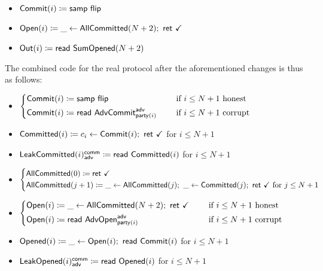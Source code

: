 \begin{itemize}
\item {\color{blue} $\mathsf{Commit}(i) \coloneqq \mathsf{samp} \ \mathsf{flip}$}
\item {\color{teal} $\Open(i) \coloneqq \_ \leftarrow \AllCommitted(N+2); \ \ret{\checkmark}$}
\item $\mathsf{Out}(i) \coloneqq \mathsf{read} \ \mathsf{SumOpened}(N+2)$
\end{itemize}

\noindent The combined code for the real protocol after the aforementioned changes is thus as follows:

\begin{itemize}
\item {\color{blue} $\begin{cases*} \Commit(i) \coloneqq \samp{\flip} & \hspace{10pt} \text{if $i \leq N+1$ honest} \\ \Commit(i) \coloneqq \read{\AdvCommit^\adv_{\party(i)}} & \hspace{10pt} \text{if $i \leq N+1$ corrupt} \end{cases*}$}
\item {\color{magenta} $\mathsf{Committed}(i) \coloneqq c_i \leftarrow \mathsf{Commit}(i); \ \mathsf{ret} \ \checkmark$ for $i \leq N+1$}
\item {\color{magenta} $\mathsf{LeakCommitted}(i)^{\mathsf{comm}}_{\mathsf{adv}} \coloneqq \mathsf{read} \ \mathsf{Committed}(i)$ for $i \leq N+1$}
\item {\color{magenta} $\begin{cases*} \AllCommitted(0) \coloneqq \ret{\checkmark} \\ \AllCommitted(j+1) \coloneqq \_ \leftarrow \AllCommitted(j); \ \_ \leftarrow \Committed(j); \ \ret{\checkmark} \text{ for $j \leq N+1$} \end{cases*}$}
\item {\color{teal} $\begin{cases*} \Open(i) \coloneqq \_ \leftarrow \AllCommitted(N+2); \ \ret{\checkmark} & \hspace{10pt} \text{if $i \leq N+1$ honest} \\ \Open(i) \coloneqq \read{\AdvOpen^\adv_{\party(i)}} & \hspace{10pt} \text{if $i \leq N+1$ corrupt} \end{cases*}$}
\item {\color{red} $\mathsf{Opened}(i) \coloneqq \_ \leftarrow \mathsf{Open}(i); \ \mathsf{read} \ \mathsf{Commit}(i)$ for $i \leq N+1$}
\item {\color{red} $\mathsf{LeakOpened}(i)^{\mathsf{comm}}_{\mathsf{adv}} \coloneqq \mathsf{read} \ \mathsf{Opened}(i)$ for $i \leq N+1$}

\end{itemize}
